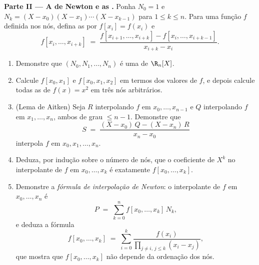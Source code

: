\begin{problem}
\medskip
\noindent\textbf{Parte II --- A  de Newton e as .} Ponha $N_0 = 1$ e $N_k = (X - x_0)(X - x_1) \cdots
(X - x_{k-1})$ para $1 \leq k \leq n$. Para uma função $f$
definida nos nós, defina as \emph{} por
$f[x_i] = f(x_i)$ e
\[
f[x_i, \dots, x_{i+k}] \;=\;
\frac{f[x_{i+1}, \dots, x_{i+k}] - f[x_i, \dots, x_{i+k-1}]}
{x_{i+k} - x_i} .
\]
\begin{enumerate}[resume]
  \item Demonstre que $(N_0, N_1, \dots, N_n)$ é uma  de
        $\R_n[X]$.
  \item Calcule $f[x_0, x_1]$ e $f[x_0, x_1, x_2]$ em termos dos
        valores de $f$, e depois calcule todas as  de $f(x) = x^2$ em três nós arbitrários.
  \item (Lema de Aitken) Seja $R$ interpolando $f$ em $x_0, \dots,
        x_{n-1}$ e $Q$
        interpolando $f$ em $x_1, \dots, x_n$, ambos de grau $\leq n - 1$. Demonstre
        que
        \[
        S \;=\; \frac{(X - x_0)\,Q - (X - x_n)\,R}{x_n - x_0}
        \]
        interpola $f$ em $x_0, x_1, \dots, x_n$.
  \item Deduza, por indução sobre o número de nós, que o
        coeficiente de $X^{k}$ no interpolante de $f$ em $x_0,
        \dots, x_k$
        é exatamente $f[x_0, \dots, x_k]$.
  \item Demonstre a \emph{fórmula de interpolação de Newton}: o
        interpolante de $f$ em $x_0, \dots, x_n$ é
        \[
        P \;=\; \sum_{k=0}^{n} f[x_0, \dots, x_k]\, N_k ,
        \]
        e deduza a fórmula 
        \[
        f[x_0, \dots, x_k] \;=\; \sum_{i=0}^{k}
        \frac{f(x_i)}{\prod_{j \neq i,\, j \leq k} (x_i - x_j)} ,
        \]
        que mostra que $f[x_0, \dots, x_k]$ não depende da ordenação dos nós.
\end{enumerate}


\end{problem}
